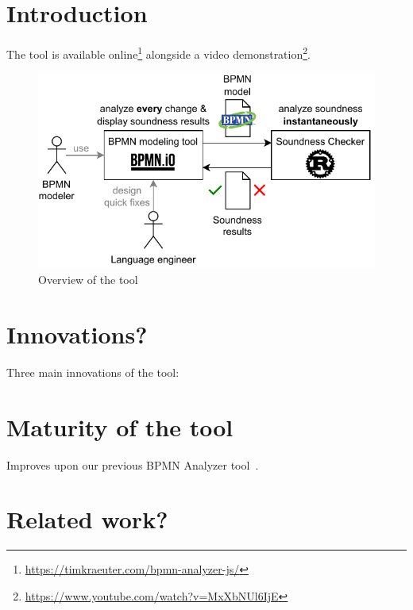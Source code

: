 \documentclass[
twocolumn,
]{ceurart}
\begin{document}
\section{Introduction}
The tool is available online\footnote{\url{https://timkraeuter.com/bpmn-analyzer-js/}} alongside a video demonstration\footnote{\url{https://www.youtube.com/watch?v=MxXbNUl6IjE}}.

\begin{figure}[ht]
	\centering
	\includegraphics[width=\linewidth]{images/overview}
	\caption{Overview of the tool}
	\label{fig:overview}
\end{figure}

\section{Innovations?} %
Three main innovations of the tool:

\section{Maturity of the tool}
Improves upon our previous BPMN Analyzer tool~\cite{krauterFormalizationAnalysisBPMN2023}.



\section{Related work?}
\end{document}
